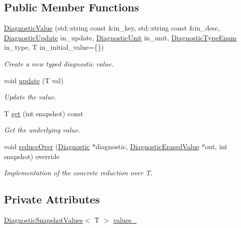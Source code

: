 \subsection*{Public Member Functions}
\begin{DoxyCompactItemize}
\item 
\hyperlink{structvt_1_1runtime_1_1component_1_1detail_1_1_diagnostic_value_a1f1d532b0ae94e08dedc322978f3a665}{Diagnostic\+Value} (std\+::string const \&in\+\_\+key, std\+::string const \&in\+\_\+desc, \hyperlink{namespacevt_1_1runtime_1_1component_a896637e6e183a909a17bfd8d3943c206}{Diagnostic\+Update} in\+\_\+update, \hyperlink{namespacevt_1_1runtime_1_1component_a99ec18b08862c712176126bb7d0e307a}{Diagnostic\+Unit} in\+\_\+unit, \hyperlink{namespacevt_1_1runtime_1_1component_af0bb99d9a054682217874bdc735ecac0}{Diagnostic\+Type\+Enum} in\+\_\+type, T in\+\_\+initial\+\_\+value=\{\})
\begin{DoxyCompactList}\small\item\em Create a new typed diagnostic value. \end{DoxyCompactList}\item 
void \hyperlink{structvt_1_1runtime_1_1component_1_1detail_1_1_diagnostic_value_a7d976c2d528e5780520ee1f1b8dfddb9}{update} (T val)
\begin{DoxyCompactList}\small\item\em Update the value. \end{DoxyCompactList}\item 
T \hyperlink{structvt_1_1runtime_1_1component_1_1detail_1_1_diagnostic_value_aef8559dc2c3acb7ac9e52dfe94bc0b3a}{get} (int snapshot) const
\begin{DoxyCompactList}\small\item\em Get the underlying value. \end{DoxyCompactList}\item 
void \hyperlink{structvt_1_1runtime_1_1component_1_1detail_1_1_diagnostic_value_aa7bcf117cb8a70cee25cfd4522ca0b68}{reduce\+Over} (\hyperlink{structvt_1_1runtime_1_1component_1_1_diagnostic}{Diagnostic} $\ast$diagnostic, \hyperlink{structvt_1_1runtime_1_1component_1_1_diagnostic_erased_value}{Diagnostic\+Erased\+Value} $\ast$out, int snapshot) override
\begin{DoxyCompactList}\small\item\em Implementation of the concrete reduction over {\ttfamily T}. \end{DoxyCompactList}\end{DoxyCompactItemize}
\subsection*{Private Attributes}
\begin{DoxyCompactItemize}
\item 
\hyperlink{structvt_1_1runtime_1_1component_1_1detail_1_1_diagnostic_snapshot_values}{Diagnostic\+Snapshot\+Values}$<$ T $>$ \hyperlink{structvt_1_1runtime_1_1component_1_1detail_1_1_diagnostic_value_a5f2fd96bc51a48245763ebb2d0c224c7}{values\+\_\+}
\end{DoxyCompactItemize}
